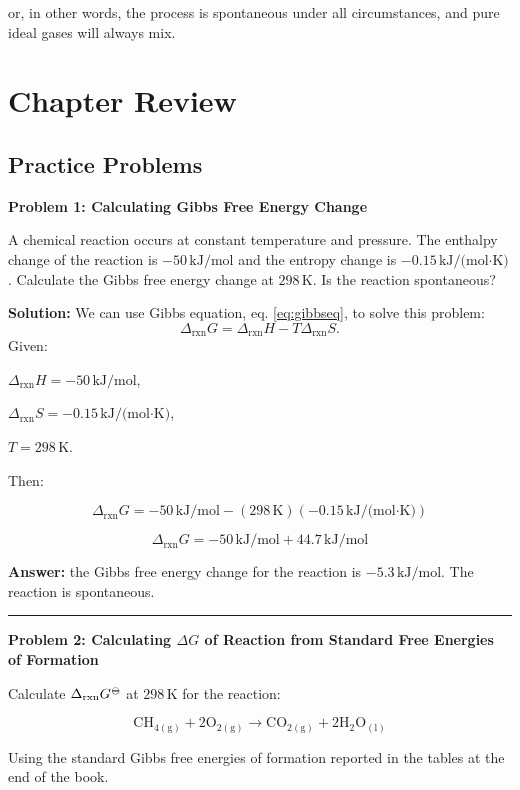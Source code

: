 \documentclass[
  9pt,
]{extbook}
\theoremstyle{definition}
\theoremstyle{definition}
\theoremstyle{definition}
\theoremstyle{definition}
\theoremstyle{remark}
\begin{document}
or, in other words, the process is spontaneous under all circumstances, and pure ideal gases will always mix.

\section{Chapter Review}\label{rev9}

\subsection{Practice Problems}\label{exer9}

\textbf{Problem 1: Calculating Gibbs Free Energy Change}

A chemical reaction occurs at constant temperature and pressure. The enthalpy change of the reaction is \(-50\,\text{kJ/mol}\) and the entropy change is \(-0.15\,\text{kJ/(mol·K)}\). Calculate the Gibbs free energy change at \(298\,\text{K}\). Is the reaction spontaneous?

\textbf{Solution:} We can use Gibbs equation, eq. \eqref{eq:gibbseq}, to solve this problem:
\[\Delta_{\text{rxn}} G= \Delta_{\text{rxn}} H - T\Delta_{\text{rxn}} S.\]
Given:

\(\Delta_{\text{rxn}} H = -50\,\text{kJ/mol}\),

\(\Delta_{\text{rxn}} S = -0.15\,\text{kJ/(mol·K)}\),

\(T=298\,\text{K}\).

Then:

\[\Delta_{\text{rxn}} G = -50\,\text{kJ/mol} - (298\,\text{K})(-0.15\,\text{kJ/(mol·K)})\]

\[\Delta_{\text{rxn}} G = -50\,\text{kJ/mol} + 44.7\,\text{kJ/mol}\]

\textbf{Answer:} the Gibbs free energy change for the reaction is \(-5.3\,\text{kJ/mol}\). The reaction is spontaneous.

\begin{center}\rule{0.5\linewidth}{0.5pt}\end{center}

\textbf{Problem 2: Calculating \(\Delta G\) of Reaction from Standard Free Energies of Formation}

Calculate \(\Delta_{\text{rxn}}G^{{-\kern-6pt{\ominus}\kern-6pt-}}\) at \(298\,\text{K}\) for the reaction:

\[\text{CH}_{4(\text{g})} + 2\text{O}_{2(\text{g})} \rightarrow \text{CO}_{2(\text{g})} + 2\text{H}_{2}\text{O}_{(\text{l})}\]

Using the standard Gibbs free energies of formation reported in the tables at the end of the book.
\end{document}
